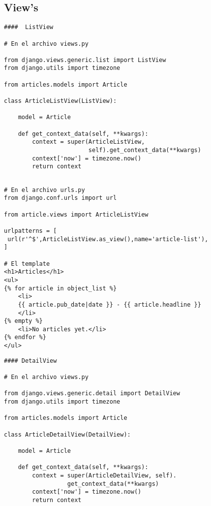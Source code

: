 \documentclass[xcolor=dvipsnames]{beamer}
\begin{document}
\subsection{View's}
\begin{frame}[fragile]
\begin{verbatim}
####  ListView

# En el archivo views.py

from django.views.generic.list import ListView
from django.utils import timezone

from articles.models import Article

class ArticleListView(ListView):

    model = Article

    def get_context_data(self, **kwargs):
        context = super(ArticleListView, 
                        self).get_context_data(**kwargs)
        context['now'] = timezone.now()
        return context

\end{verbatim}
\end{frame}

\begin{frame}[fragile]
\begin{verbatim}

# En el archivo urls.py
from django.conf.urls import url

from article.views import ArticleListView

urlpatterns = [
 url(r'^$',ArticleListView.as_view(),name='article-list'),
]

# El template
<h1>Articles</h1>
<ul>
{% for article in object_list %}
    <li>
    {{ article.pub_date|date }} - {{ article.headline }}
    </li>
{% empty %}
    <li>No articles yet.</li>
{% endfor %}
</ul>
\end{verbatim}
\end{frame}

\begin{frame}[fragile]
\begin{verbatim}
#### DetailView

# En el archivo views.py

from django.views.generic.detail import DetailView
from django.utils import timezone

from articles.models import Article

class ArticleDetailView(DetailView):

    model = Article

    def get_context_data(self, **kwargs):
        context = super(ArticleDetailView, self).
                  get_context_data(**kwargs)
        context['now'] = timezone.now()
        return context
        
\end{verbatim}
\end{frame}
\end{document}
